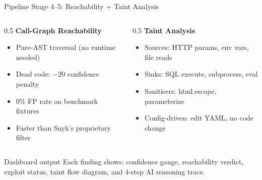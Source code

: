 \documentclass[aspectratio=169,12pt]{beamer}
\begin{document}
\begin{frame}{Pipeline Stage 4--5: Reachability + Taint Analysis}
  \begin{columns}[T]
    \begin{column}{0.5\textwidth}
      \textbf{Call-Graph Reachability}
      \begin{itemize}
        \item Pure-AST traversal (no runtime needed)
        \item Dead code: \(-20\) confidence penalty
        \item 0\% FP rate on benchmark fixtures
        \item Faster than Snyk's proprietary filter
      \end{itemize}
    \end{column}
    \begin{column}{0.5\textwidth}
      \textbf{Taint Analysis}
      \begin{itemize}
        \item Sources: HTTP params, env vars, file reads
        \item Sinks: SQL execute, subprocess, eval
        \item Sanitisers: html.escape, parameterize
        \item Config-driven: edit YAML, no code change
      \end{itemize}
    \end{column}
  \end{columns}
  \vspace{6pt}
  \begin{block}{Dashboard output}
    Each finding shows: confidence gauge, reachability verdict,
    exploit status, taint flow diagram, and 4-step AI reasoning trace.
  \end{block}
\end{frame}
\end{document}

